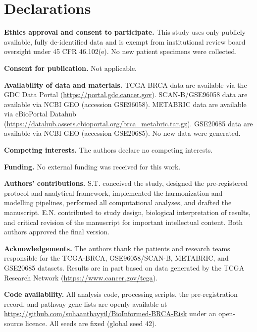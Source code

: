 \documentclass[11pt,letterpaper]{article}
\begin{document}

\section*{Declarations}

\noindent\textbf{Ethics approval and consent to participate.} This study uses only publicly available, fully de-identified data and is exempt from institutional review board oversight under 45 CFR 46.102(e). No new patient specimens were collected.

\noindent\textbf{Consent for publication.} Not applicable.

\noindent\textbf{Availability of data and materials.} TCGA-BRCA data are available via the GDC Data Portal (\url{https://portal.gdc.cancer.gov}). SCAN-B/GSE96058 data are available via NCBI GEO (accession GSE96058). METABRIC data are available via cBioPortal Datahub (\url{https://datahub.assets.cbioportal.org/brca_metabric.tar.gz}). GSE20685 data are available via NCBI GEO (accession GSE20685). No new data were generated.

\noindent\textbf{Competing interests.} The authors declare no competing interests.

\noindent\textbf{Funding.} No external funding was received for this work.

\noindent\textbf{Authors' contributions.} S.T. conceived the study, designed the pre-registered protocol and analytical framework, implemented the harmonization and modelling pipelines, performed all computational analyses, and drafted the manuscript. E.N. contributed to study design, biological interpretation of results, and critical revision of the manuscript for important intellectual content. Both authors approved the final version.

\noindent\textbf{Acknowledgements.} The authors thank the patients and research teams responsible for the TCGA-BRCA, GSE96058/SCAN-B, METABRIC, and GSE20685 datasets. Results are in part based on data generated by the TCGA Research Network (\url{https://www.cancer.gov/tcga}).

\noindent\textbf{Code availability.} All analysis code, processing scripts, the pre-registration record, and pathway gene lists are openly available at \url{https://github.com/suhaanthayyil/BioInformed-BRCA-Risk} under an open-source licence. All seeds are fixed (global seed 42).
\end{document}
